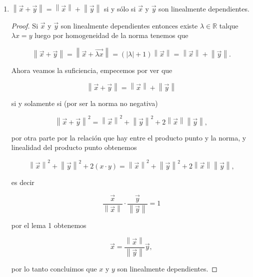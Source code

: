 \documentclass[letterpaper]{article}
\theoremstyle{definition}
\theoremstyle{lemathm}
\theoremstyle{lemathm}
\theoremstyle{lemathm}
\theoremstyle{lemademthm}
\newcommand{\abs}[1]{\left| #1 \right| }
\newcommand{\pars}[1]{\left( #1 \right) }
\newcommand{\norm}[1]{\left\lVert#1\right\rVert}
\newcommand{\RR}{\mathbb{R}}
\newcommand{\1}{\mathbbm{1}}
\begin{document}
\begin{enumerate}
\begin{enumerate}
\begin{proof}
				Ahora si $\abs{\vec{x}\cdot\vec{y}} = \norm{\vec{x}}\norm{\vec{y}}$ entonces por linealidad del producto punto obtenemos

				\[\abs{\frac{\vec{x}}{\norm{x}}\cdot\frac{\vec{y}}{\norm{y}}} = 1.\]

				por el lema 1 tenemos

				\[\frac{\vec{x}}{\norm{x}} = \frac{\vec{y}}{\norm{y}}.\]

				por lo tanto concluimos

				\[\vec{x} = \frac{\norm{x}}{\norm{y}} \vec{y},\]

				es decir $x$ y $y$ son linealmente dependientes.
			\end{proof}
			\item $\norm{\vec{x}+\vec{y}} = \norm{\vec{x}}+\norm{\vec{y}}$ si y sólo si $\vec{x}$ y $\vec{y}$ son linealmente dependientes.
			
			\begin{proof}
				Si $\vec{x}$ y $\vec{y}$ son linealmente dependientes entonces existe $\lambda\in\RR$ talque $\lambda x = y$ luego por homogeneidad de la norma tenemos que

				\[\norm{\vec{x}+\vec{y}} = \norm{\vec{x}+\vec{\lambda x}} = \pars{\abs{\lambda}+1}\norm{\vec{x}} = \norm{\vec{x}} + \norm{\vec{y}}.\]

				Ahora veamos la suficiencia, empecemos por ver que

				\[\norm{\vec{x} + \vec{y}} = \norm{\vec{x}} + \norm{\vec{y}}\]

				si y solamente si (por ser la norma no negativa)

				\[\norm{\vec{x} + \vec{y}}^2 = \norm{\vec{x}}^2 + \norm{\vec{y}}^2 + 2\norm{\vec{x}}\norm{\vec{y}},\]
				
				por otra parte por la relación que hay entre el producto punto y la norma, y linealidad del producto punto obtenemos

				\[\norm{\vec{x}}^2 + \norm{\vec{y}}^2 + 2(x\cdot y) = \norm{\vec{x}}^2 + \norm{\vec{y}}^2 + 2\norm{\vec{x}}\norm{\vec{y}},\]

				es decir

				\[\frac{\vec{x}}{\norm{\vec{x}}}\cdot \frac{\vec{y}}{\norm{\vec{y}}} = 1\]

				por el lema 1 obtenemos

				\[\vec{x} = \frac{\norm{\vec{x}}}{\norm{\vec{y}}} \vec{y},\]

				por lo tanto concluimos que $x$ y $y$ son linealmente dependientes.
			\end{proof}
			

\end{enumerate}
\end{enumerate}
\end{document}
